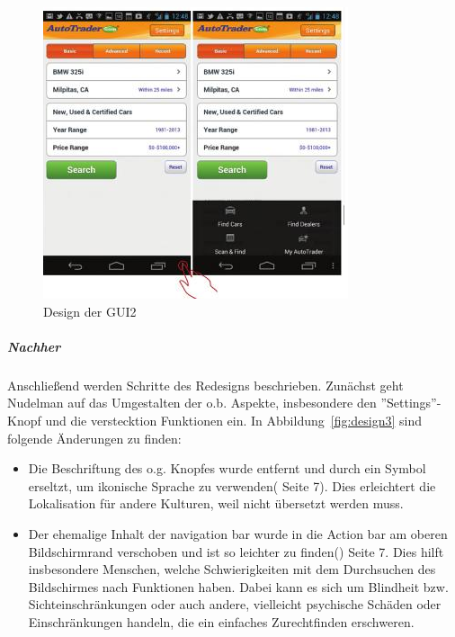 \begin{figure}[!h]
 \centering
 \includegraphics[height=0.40\textheight]{img/Design2.png}
 \caption{Design der GUI2}
 \label{fig:design2}
\end{figure}

\subparagraph{Nachher}
\label{subp:nachher}
Anschließend werden Schritte des Redesigns beschrieben. Zunächst geht Nudelman auf das Umgestalten der o.b. Aspekte, insbesondere den ''Settings''-Knopf und die verstecktion Funktionen ein. In Abbildung~\ref{fig:design3} sind folgende Änderungen zu finden: \\
\begin{itemize}
\item Die Beschriftung des o.g. Knopfes wurde entfernt und durch ein Symbol erseltzt, um ikonische Sprache zu verwenden(\cite{AndroidDesignPatterns} Seite 7). Dies erleichtert die Lokalisation für andere Kulturen, weil nicht übersetzt werden muss. 
\item Der ehemalige Inhalt der navigation bar wurde in die Action bar am oberen Bildschirmrand verschoben und ist so leichter zu finden(\cite{AndroidDesignPatterns}) Seite 7. Dies hilft insbesondere Menschen, welche Schwierigkeiten mit dem Durchsuchen des Bildschirmes nach Funktionen haben. Dabei kann es sich um Blindheit bzw. Sichteinschränkungen oder auch andere, vielleicht psychische Schäden oder Einschränkungen handeln, die ein einfaches Zurechtfinden erschweren.
\end{itemize}


